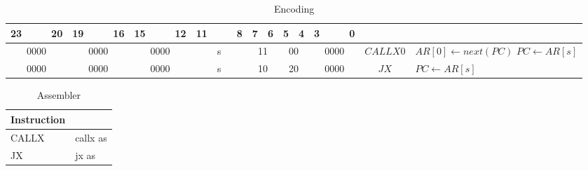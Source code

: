 	\begin{longtable}{llllllllllllllllllllllll  p{1cm}  p{6cm} | }
		\caption{Encoding\label{long}}\\
		23 & & & 20 & 19 & & & 16 & 15 & & & 12 & 11 & & & 8 & 7 & 6 & 5 & 4 & 3 & & & 0 & & \multicolumn{1}{c}{}\\
		\hline
		\multicolumn{4}{|c|}{0000} & \multicolumn{4}{c|}{0000} & \multicolumn{4}{c|}{0000} & \multicolumn{4}{c|}{s} & \multicolumn{2}{c|}{11} & \multicolumn{2}{c|}{00} & \multicolumn{4}{c|}{0000} & \multicolumn{1}{c|}{$CALLX0$} & $AR[0] \leftarrow next(PC)$ \newline $PC \leftarrow AR[s]$\\ \hline
		\multicolumn{4}{|c|}{0000} & \multicolumn{4}{c|}{0000} & \multicolumn{4}{c|}{0000} & \multicolumn{4}{c|}{s} & \multicolumn{2}{c|}{10} & \multicolumn{2}{c|}{20} & \multicolumn{4}{c|}{0000} & \multicolumn{1}{c|}{$JX$} & $PC \leftarrow AR[s]$\\ \hline
	\end{longtable}

	\begin{longtable}{|p{5cm}|p{5cm}|}
		\caption{Assembler\label{long}}\\
		\hline
		Instruction & \\
		\hline
		CALLX & callx as\\ \hline
		JX & jx as\\ \hline
	\end{longtable}
